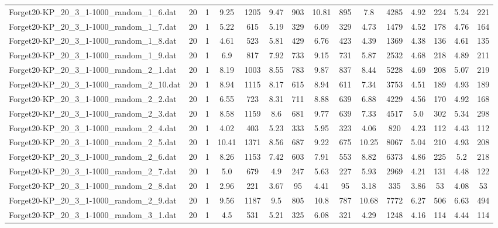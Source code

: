 \begin{table}[!ht]
{\begin{tabular}{lcccccccccccccc}
Forget20-KP\_20\_3\_1-1000\_random\_1\_6.dat & 20 & 1 & 9.25 & 1205 & 9.47 & 903 & 10.81 & 895 & 7.8 & 4285 & 4.92 & 224 & 5.24 & 221 \\
Forget20-KP\_20\_3\_1-1000\_random\_1\_7.dat & 20 & 1 & 5.22 & 615 & 5.19 & 329 & 6.09 & 329 & 4.73 & 1479 & 4.52 & 178 & 4.76 & 164 \\
Forget20-KP\_20\_3\_1-1000\_random\_1\_8.dat & 20 & 1 & 4.61 & 523 & 5.81 & 429 & 6.76 & 423 & 4.39 & 1369 & 4.38 & 136 & 4.61 & 135 \\
Forget20-KP\_20\_3\_1-1000\_random\_1\_9.dat & 20 & 1 & 6.9 & 817 & 7.92 & 733 & 9.15 & 731 & 5.87 & 2532 & 4.68 & 218 & 4.89 & 211 \\
Forget20-KP\_20\_3\_1-1000\_random\_2\_1.dat & 20 & 1 & 8.19 & 1003 & 8.55 & 783 & 9.87 & 837 & 8.44 & 5228 & 4.69 & 208 & 5.07 & 219 \\
Forget20-KP\_20\_3\_1-1000\_random\_2\_10.dat & 20 & 1 & 8.94 & 1115 & 8.17 & 615 & 8.94 & 611 & 7.34 & 3753 & 4.51 & 189 & 4.93 & 189 \\
Forget20-KP\_20\_3\_1-1000\_random\_2\_2.dat & 20 & 1 & 6.55 & 723 & 8.31 & 711 & 8.88 & 639 & 6.88 & 4229 & 4.56 & 170 & 4.92 & 168 \\
Forget20-KP\_20\_3\_1-1000\_random\_2\_3.dat & 20 & 1 & 8.58 & 1159 & 8.6 & 681 & 9.77 & 639 & 7.33 & 4517 & 5.0 & 302 & 5.34 & 298 \\
Forget20-KP\_20\_3\_1-1000\_random\_2\_4.dat & 20 & 1 & 4.02 & 403 & 5.23 & 333 & 5.95 & 323 & 4.06 & 820 & 4.23 & 112 & 4.43 & 112 \\
Forget20-KP\_20\_3\_1-1000\_random\_2\_5.dat & 20 & 1 & 10.41 & 1371 & 8.56 & 687 & 9.22 & 675 & 10.25 & 8067 & 5.04 & 210 & 4.93 & 208 \\
Forget20-KP\_20\_3\_1-1000\_random\_2\_6.dat & 20 & 1 & 8.26 & 1153 & 7.42 & 603 & 7.91 & 553 & 8.82 & 6373 & 4.86 & 225 & 5.2 & 218 \\
Forget20-KP\_20\_3\_1-1000\_random\_2\_7.dat & 20 & 1 & 5.0 & 679 & 4.9 & 247 & 5.63 & 227 & 5.93 & 2969 & 4.21 & 131 & 4.48 & 122 \\
Forget20-KP\_20\_3\_1-1000\_random\_2\_8.dat & 20 & 1 & 2.96 & 221 & 3.67 & 95 & 4.41 & 95 & 3.18 & 335 & 3.86 & 53 & 4.08 & 53 \\
Forget20-KP\_20\_3\_1-1000\_random\_2\_9.dat & 20 & 1 & 9.56 & 1187 & 9.5 & 805 & 10.8 & 787 & 10.68 & 7772 & 6.27 & 506 & 6.63 & 494 \\
Forget20-KP\_20\_3\_1-1000\_random\_3\_1.dat & 20 & 1 & 4.5 & 531 & 5.21 & 325 & 6.08 & 321 & 4.29 & 1248 & 4.16 & 114 & 4.44 & 114 \\

\end{tabular}}
\end{table}
